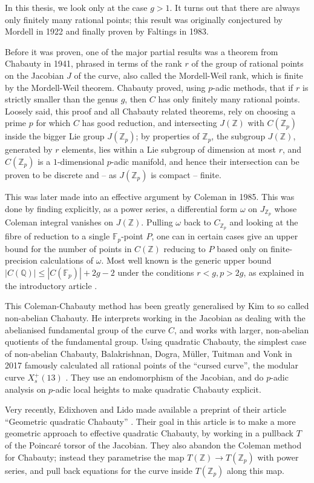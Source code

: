 \documentclass[12pt]{article}
\newcommand{\Z}{\mathbb{Z}}
\newcommand{\Q}{\mathbb{Q}}
\newcommand{\F}{\mathbb{F}}
\theoremstyle{plain}
\theoremstyle{definition}
\theoremstyle{remark}
\begin{document}
In this thesis, we look only at the case $g > 1$. It turns out that there are always only finitely many rational points; this result was originally conjectured by Mordell in 1922 and finally proven by Faltings in 1983.

Before it was proven, one of the major partial results was a theorem from Chabauty in 1941, phrased in terms of the rank $r$ of the group of rational points on the Jacobian $J$ of the curve, also called the Mordell-Weil rank, which is finite by the Mordell-Weil theorem. Chabauty proved, using $p$-adic methods, that if $r$ is strictly smaller than the genus $g$, then $C$ has only finitely many rational points. Loosely said, this proof and all Chabauty related theorems, rely on choosing a prime $p$ for which $C$ has good reduction, and intersecting $J(\Z)$ with $C(\Z_p)$ inside the bigger Lie group $J(\Z_p)$; by properties of $\Z_p$, the subgroup $J(\Z)$, generated by $r$ elements, lies within a Lie subgroup of dimension at most $r$, and $C(\Z_p)$ is a $1$-dimensional $p$-adic manifold, and hence their intersection can be proven to be discrete and -- as $J(\Z_p)$ is compact -- finite.

This was later made into an effective argument by Coleman in 1985. This was done by finding explicitly, as a power series, a differential form $\omega$ on $J_{\Z_p}$ whose Coleman integral vanishes on $J(\Z)$. Pulling $\omega$ back to $C_{\Z_p}$ and looking at the fibre of reduction to a single $\F_p$-point $P$, one can in certain cases give an upper bound for the number of points in $C(\Z)$ reducing to $P$ based only on finite-precision calculations of $\omega$. Most well known is the generic upper bound $|C(\Q)| \leq |C(\F_p)| + 2g-2$ under the conditions $r < g, p > 2g$, as explained in the introductory article \citep{poonen12}.

This Coleman-Chabauty method has been greatly generalised by Kim to so called non-abelian Chabauty. He interprets working in the Jacobian as dealing with the abelianised fundamental group of the curve $C$, and works with larger, non-abelian quotients of the fundamental group. Using quadratic Chabauty, the simplest case of non-abelian Chabauty, Balakrishnan, Dogra, M\"uller, Tuitman and Vonk in 2017 famously calculated  all rational points of the ``cursed curve'', the modular curve $X_s^+(13)$ \citep{cursedcurve}. They use an endomorphism of the Jacobian, and do $p$-adic analysis on $p$-adic local heights to make quadratic Chabauty explicit. 

Very recently, Edixhoven and Lido made available a preprint of their article ``Geometric quadratic Chabauty'' \citep{edixhoven20}. Their goal in this article is to make a more geometric approach to effective quadratic Chabauty, by working in a pullback $T$ of the Poincar\'e torsor of the Jacobian. They also abandon the Coleman method for Chabauty; instead they parametrise the map $T(\Z) \to T(\Z_p)$ with power series, and pull back equations for the curve inside $T(\Z_p)$ along this map. 
\end{document}
